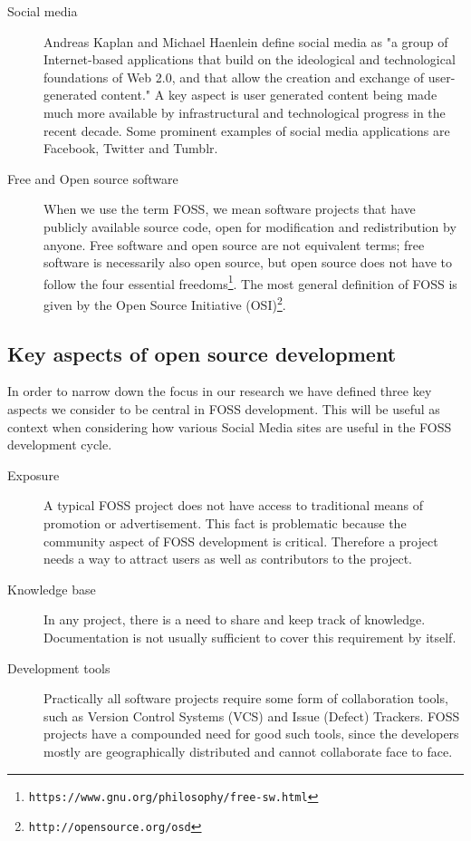 \documentclass[a4paper,11pt]{article} %
\begin{document}
\begin{description}
\item[Social media] \hfill
  
  Andreas Kaplan and Michael Haenlein define social media as "a group of
  Internet-based applications that build on the ideological and
  technological foundations of Web 2.0, and that allow the creation and
  exchange of user-generated content."\cite{Kaplan201059} A key aspect is
  user generated content being made much more available by infrastructural
  and technological progress in the recent decade. Some prominent examples
  of social media applications are Facebook, Twitter and Tumblr.

\item[Free and Open source software] \hfill

  When we use the term FOSS, we mean software projects that have publicly
  available source code, open for modification and redistribution by
  anyone\cite[.p~18,p.~57]{leister2014opensource}. Free software and open
  source are not equivalent terms; free software is necessarily also open
  source, but open source does not have to follow the four essential
  freedoms\footnote{\texttt{https://www.gnu.org/philosophy/free-sw.html}}. The
  most general definition of FOSS is given by the Open Source Initiative
  (OSI)\footnote{\texttt{http://opensource.org/osd}}.

\end{description}

\subsection{Key aspects of open source development}

In order to narrow down the focus in our research we have defined three key aspects
we consider to be central in FOSS development. This will be useful as context
when considering how various Social Media sites are useful in the FOSS development cycle.

\begin{description}
\item[Exposure] \hfill
  
  A typical FOSS project does not have access to traditional means of
  promotion or advertisement. This fact is problematic because the community
  aspect of FOSS development is critical. Therefore a project needs a way to
  attract users as well as contributors to the project.
\item[Knowledge base] \hfill

  In any project, there is a need to share and keep track of
  knowledge. Documentation is not usually sufficient to cover this
  requirement by itself.
\item[Development tools] \hfill
  
  Practically all software projects require some form of collaboration
  tools, such as Version Control Systems (VCS) and Issue (Defect)
  Trackers. FOSS projects have a compounded need for good such tools, since
  the developers mostly are geographically distributed and cannot
  collaborate face to face.
\end{description}
\end{document}
